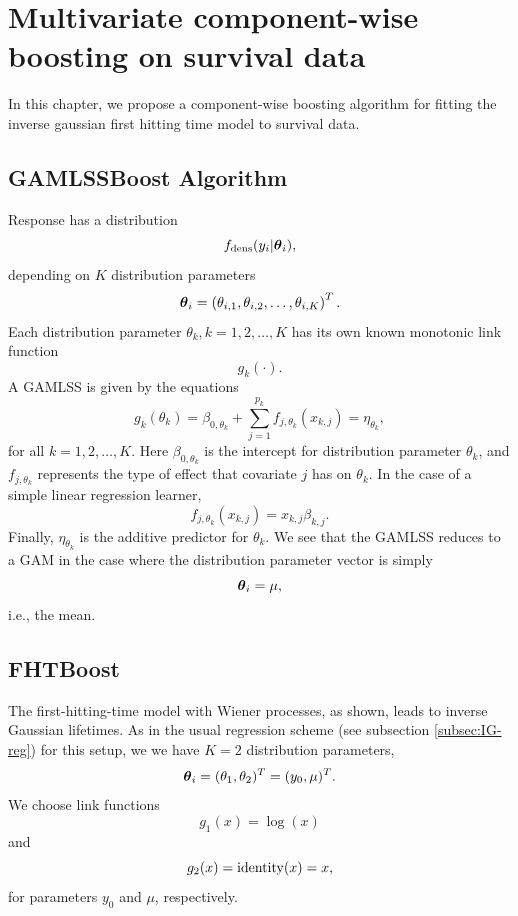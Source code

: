 \chapter{Multivariate component-wise boosting on survival data}
In this chapter, we propose a component-wise boosting algorithm for fitting the inverse gaussian first hitting time model to survival data.

\section{GAMLSSBoost Algorithm}
Response has a distribution
\begin{equation}
    f_{\text{dens}}(y_i|\boldsymbol{\theta}_i),
\end{equation}
depending on $K$ distribution parameters
\begin{equation}
    \boldsymbol{\theta}_i=\left(\theta_{i,1},\theta_{i,2},\ldots,\theta_{i,K}\right)^T.
\end{equation}
Each distribution parameter $\theta_k,k=1,2,\ldots,K$ has its own known monotonic link function
\begin{equation}
    g_k(\cdot).
\end{equation}
A GAMLSS is given by the equations
\begin{equation}
    g_k(\theta_k)=\beta_{0,\theta_k}+\sum_{j=1}^{p_k}f_{j,\theta_k}(x_{k,j})=\eta_{\theta_k},
\end{equation}
for all $k=1,2,\ldots,K$. Here $\beta_{0,\theta_k}$ is the intercept for distribution parameter $\theta_k$, and $f_{j,\theta_k}$
represents the type of effect that covariate $j$ has on $\theta_k$.
In the case of a simple linear regression learner,
\begin{equation}
    f_{j,\theta_k}(x_{k,j})=x_{k,j}\beta_{k,j}.
\end{equation}
Finally, $\eta_{\theta_k}$ is the additive predictor for $\theta_k$. We see that the GAMLSS reduces to a GAM \citep{gam-book} in the case
where the distribution parameter vector is simply
\begin{equation}
    \boldsymbol{\theta}_i=\mu,
\end{equation}
i.e., the mean.

\section{FHTBoost}
The first-hitting-time model with Wiener processes, as shown, leads to inverse Gaussian lifetimes. As in the usual
regression scheme (see subsection \ref{subsec:IG-reg}) for this setup, we we have $K=2$ distribution parameters,
\begin{equation}
    \boldsymbol{\theta}_i=(\theta_1,\theta_2)^T=(y_0,\mu)^T.
\end{equation}
We choose link functions
\begin{equation}
    g_1(x)=\log(x)
\end{equation}
and
\begin{equation}
    g_2(x)=\operatorname{identity}(x)=x,
\end{equation}
for parameters $y_0$ and $\mu$, respectively.

